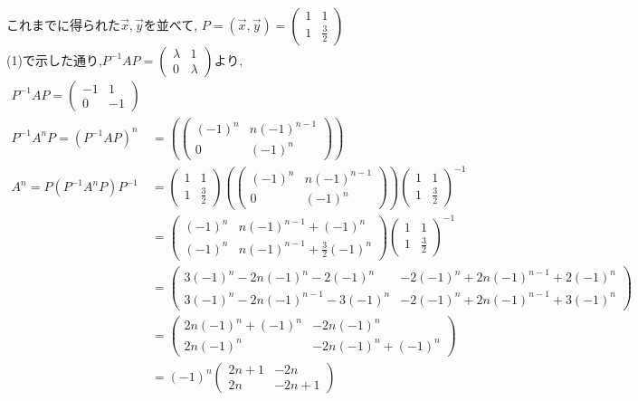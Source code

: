 \documentclass{jsarticle}
\begin{document}
\leavevmode\\
これまでに得られた$\overrightarrow{x},\overrightarrow{y}$を並べて,
$P =( \overrightarrow{x},\overrightarrow{y} )= \begin{pmatrix}1&1\\1&\frac{3}{2} \end{pmatrix}$
\leavevmode\\
(1)で示した通り,$P^{-1}AP = \begin{pmatrix}\lambda &1\\0&\lambda \end{pmatrix}$より,
  \begin{align*}
    P^{-1}AP = \begin{pmatrix}-1&1\\0&-1\end{pmatrix}\\
    P^{-1}A^n P = (P^{-1}AP)^n &= \left(\begin{pmatrix}(-1)^n&n(-1)^{n-1}\\0&(-1)^n\end{pmatrix}\right)\\
    A^n = P(P^{-1}A^n P)P^{-1} &= \begin{pmatrix}1&1\\1&\frac{3}{2} \end{pmatrix} \left(\begin{pmatrix}(-1)^n&n(-1)^{n-1}\\0&(-1)^n\end{pmatrix}\right) \begin{pmatrix}1&1\\1&\frac{3}{2} \end{pmatrix}^{-1}\\
                               &= \begin{pmatrix}(-1)^n&n(-1)^{n-1}+(-1)^n\\(-1)^n&n(-1)^{n-1}+\frac{3}{2}(-1)^n \end{pmatrix}\begin{pmatrix}1&1\\1&\frac{3}{2} \end{pmatrix}^{-1}\\
                               &= \begin{pmatrix} 3(-1)^n -2n(-1)^n -2(-1)^n &-2(-1)^n+2n(-1)^{n-1}+2(-1)^n\\3(-1)^n -2n(-1)^{n-1} -3(-1)^n&-2(-1)^n+2n(-1)^{n-1}+3(-1)^n\end{pmatrix}\\
                               &= \begin{pmatrix} 2n(-1)^n+(-1)^n&-2n(-1)^n\\2n(-1)^n&-2n(-1)^n+(-1)^n\end{pmatrix}\\
                               &= (-1)^n\begin{pmatrix}2n+1&-2n\\2n&-2n+1\end{pmatrix}
\end{align*}
\end{document}
